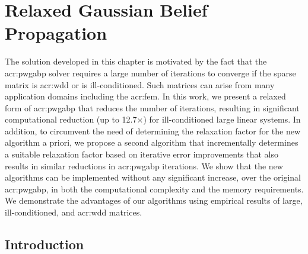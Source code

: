 \graphicspath{{./figs/Chp-RelGaBP/}}




\chapter{Relaxed Gaussian Belief Propagation}
\label{chp:relGaBP}
The solution developed in this chapter is motivated by the fact that the \gls{acr:pwgabp} solver requires a large number of iterations to converge if the sparse matrix is \gls{acr:wdd} or is ill-conditioned.
Such matrices can arise from many application domains including the \gls{acr:fem}.
In this work, we present a relaxed form of \gls{acr:pwgabp} that reduces the number of iterations, resulting in significant computational reduction (up to 12.7$\times$) for ill-conditioned large linear systems.
In addition, to circumvent the need of determining the relaxation factor for the new algorithm a priori, we propose a second algorithm that incrementally determines a suitable relaxation factor based on iterative error improvements that also results in similar reductions in \gls{acr:pwgabp} iterations.
We show that the new algorithms can be implemented without any significant increase, over the original \gls{acr:pwgabp}, in both the computational complexity and the memory requirements.
We demonstrate the advantages of our algorithms using empirical results of large, ill-conditioned, and \gls{acr:wdd} matrices.


\section{Introduction}

